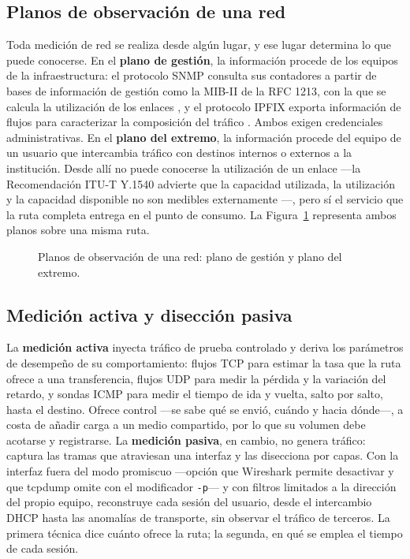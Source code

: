 \subsection{Planos de observación de una red}

Toda medición de red se realiza desde algún lugar, y ese lugar determina lo que puede conocerse. En el \textbf{plano de gestión}, la información procede de los equipos de la infraestructura: el protocolo SNMP consulta sus contadores a partir de bases de información de gestión como la MIB-II de la RFC 1213, con la que se calcula la utilización de los enlaces \cite{rfc1213}, y el protocolo IPFIX exporta información de flujos para caracterizar la composición del tráfico \cite{rfc7011}. Ambos exigen credenciales administrativas. En el \textbf{plano del extremo}, la información procede del equipo de un usuario que intercambia tráfico con destinos internos o externos a la institución. Desde allí no puede conocerse la utilización de un enlace ---la Recomendación ITU-T Y.1540 advierte que la capacidad utilizada, la utilización y la capacidad disponible no son medibles externamente \cite{ituy1540}---, pero sí el servicio que la ruta completa entrega en el punto de consumo. La Figura~\ref{fig:planos_observacion} representa ambos planos sobre una misma ruta.

\begin{figure}[htbp]
  \centering
  
  \caption{Planos de observación de una red: plano de gestión y plano del extremo.}
  \label{fig:planos_observacion}
  \raggedright
\end{figure}

\subsection{Medición activa y disección pasiva}

La \textbf{medición activa} inyecta tráfico de prueba controlado y deriva los parámetros de desempeño de su comportamiento: flujos TCP para estimar la tasa que la ruta ofrece a una transferencia, flujos UDP para medir la pérdida y la variación del retardo, y sondas ICMP para medir el tiempo de ida y vuelta, salto por salto, hasta el destino. Ofrece control ---se sabe qué se envió, cuándo y hacia dónde---, a costa de añadir carga a un medio compartido, por lo que su volumen debe acotarse y registrarse. La \textbf{medición pasiva}, en cambio, no genera tráfico: captura las tramas que atraviesan una interfaz y las disecciona por capas. Con la interfaz fuera del modo promiscuo ---opción que Wireshark permite desactivar y que tcpdump omite con el modificador \texttt{-p}--- y con filtros limitados a la dirección del propio equipo, reconstruye cada sesión del usuario, desde el intercambio DHCP hasta las anomalías de transporte, sin observar el tráfico de terceros. La primera técnica dice cuánto ofrece la ruta; la segunda, en qué se emplea el tiempo de cada sesión.

